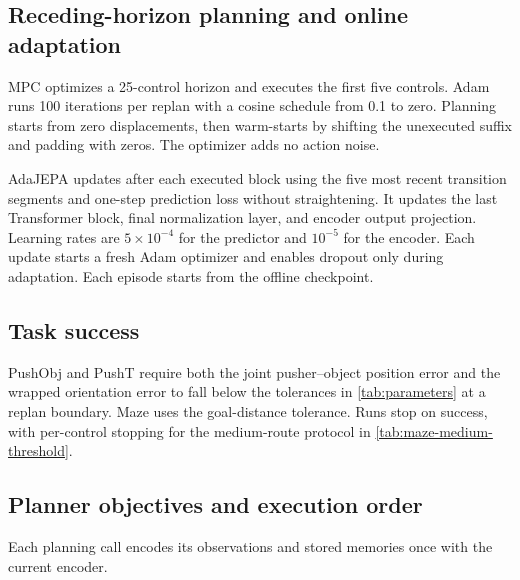 \subsection{Receding-horizon planning and online adaptation}
MPC optimizes a 25-control horizon and executes the first five controls. Adam runs 100 iterations per replan with a cosine schedule from 0.1 to zero. Planning starts from zero displacements, then warm-starts by shifting the unexecuted suffix and padding with zeros. The optimizer adds no action noise.

AdaJEPA updates after each executed block using the five most recent transition segments and one-step prediction loss without straightening. It updates the last Transformer block, final normalization layer, and encoder output projection. Learning rates are $5\times10^{-4}$ for the predictor and $10^{-5}$ for the encoder. Each update starts a fresh Adam optimizer and enables dropout only during adaptation. Each episode starts from the offline checkpoint.

\subsection{Task success}
PushObj and PushT require both the joint pusher--object position error and the wrapped orientation error to fall below the tolerances in \cref{tab:parameters} at a replan boundary. Maze uses the goal-distance tolerance. Runs stop on success, with per-control stopping for the medium-route protocol in \cref{tab:maze-medium-threshold}.

\subsection{Planner objectives and execution order}
\label{sec:parameters}
Each planning call encodes its observations and stored memories once with the current encoder.

